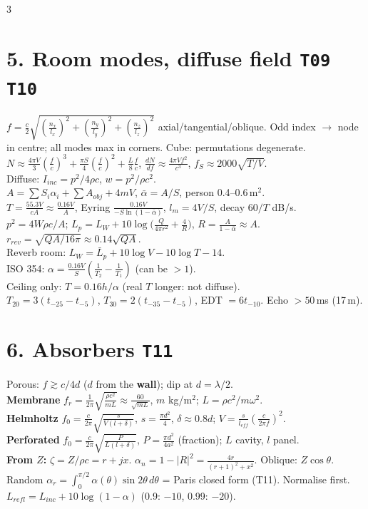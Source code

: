 \documentclass[10pt]{article}
\newcommand{\T}[1]{\textcolor{sec}{\texttt{#1}}}
\newcommand{\trap}[1]{\textcolor{trap}{#1}}
\begin{document}
\begin{multicols*}{3}
\section{5. Room modes, diffuse field \quad\T{T09 T10}}
$\boxed{f=\frac c2\sqrt{(\frac{n_x}{l_x})^2+(\frac{n_y}{l_y})^2+(\frac{n_z}{l_z})^2}}$ axial/tangential/oblique.
Odd index $\to$ node in centre; all modes max in corners. Cube: permutations degenerate.\\
$N\approx\frac{4\pi V}{3}(\frac fc)^3+\frac{\pi S}{4}(\frac fc)^2+\frac L8\frac fc$, $\frac{dN}{df}\approx\frac{4\pi Vf^2}{c^3}$, $f_S\approx2000\sqrt{T/V}$.\\
Diffuse: $I_{inc}=p^2/4\rho c$, $w=p^2/\rho c^2$.\\
$A=\sum S_i\alpha_i+\sum A_{obj}+4mV$, $\bar\alpha=A/S$, person 0.4--0.6\,m$^2$.\\
$\boxed{T=\frac{55.3V}{cA}\approx\frac{0.16V}{A}}$, Eyring $\frac{0.16V}{-S\ln(1-\bar\alpha)}$, $l_m=4V/S$, decay $60/T$ dB/s.\\
$p^2=4W\rho c/A$; $\boxed{L_p=L_W+10\log\big(\frac{Q}{4\pi r^2}+\frac4R\big)}$, $R=\frac{A}{1-\bar\alpha}\approx A$. $r_{rev}=\sqrt{QA/16\pi}\approx0.14\sqrt{QA}$.\\
Reverb room: $L_W=\bar L_p+10\log V-10\log T-14$.\\
ISO 354: $\alpha=\frac{0.16V}{S}(\frac1{T_2}-\frac1{T_1})$ (can be $>1$).\\
Ceiling only: $T=0.16h/\alpha$ (real $T$ longer: not diffuse).\\
$T_{20}=3(t_{-25}-t_{-5})$, $T_{30}=2(t_{-35}-t_{-5})$, EDT $=6t_{-10}$. Echo $>50$\,ms (17\,m).

\section{6. Absorbers \quad\T{T11}}
Porous: $f\gtrsim c/4d$ ($d$ from the \textbf{wall}); dip at $d=\lambda/2$.\\
\textbf{Membrane} $f_r=\frac1{2\pi}\sqrt{\frac{\rho c^2}{mL}}\approx\frac{60}{\sqrt{mL}}$, $m$ kg/m$^2$; $L=\rho c^2/m\omega^2$.\\
\textbf{Helmholtz} $f_0=\frac c{2\pi}\sqrt{\frac{s}{V(l+\delta)}}$, $s=\frac{\pi d^2}4$, $\delta\approx0.8d$; $V=\frac{s}{l_{eff}}(\frac{c}{2\pi f})^2$.\\
\textbf{Perforated} $f_0=\frac c{2\pi}\sqrt{\frac{P}{L(l+\delta)}}$, $P=\frac{\pi d^2}{4a^2}$ (fraction); $L$ cavity, $l$ panel.\\
\textbf{From $Z$:} $\zeta=Z/\rho c=r+jx$. $\alpha_n=1-|R|^2=\frac{4r}{(r+1)^2+x^2}$. Oblique: $Z\cos\theta$. Random $\alpha_r=\int_0^{\pi/2}\alpha(\theta)\sin2\theta\,d\theta$ = Paris closed form (T11). \trap{Normalise first.}\\
$L_{refl}=L_{inc}+10\log(1-\alpha)$ (0.9: $-10$, 0.99: $-20$).


\end{multicols*}
\end{document}
